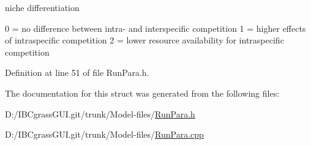 niche differentiation 

0 = no difference between intra-\/ and interspecific competition 1 = higher effects of intraspecific competition 2 = lower resource availability for intraspecific competition 

Definition at line 51 of file Run\+Para.\+h.



The documentation for this struct was generated from the following files\+:\begin{DoxyCompactItemize}
\item 
D\+:/\+I\+B\+Cgrass\+G\+U\+I.\+git/trunk/\+Model-\/files/\mbox{\hyperlink{_run_para_8h}{Run\+Para.\+h}}\item 
D\+:/\+I\+B\+Cgrass\+G\+U\+I.\+git/trunk/\+Model-\/files/\mbox{\hyperlink{_run_para_8cpp}{Run\+Para.\+cpp}}\end{DoxyCompactItemize}
